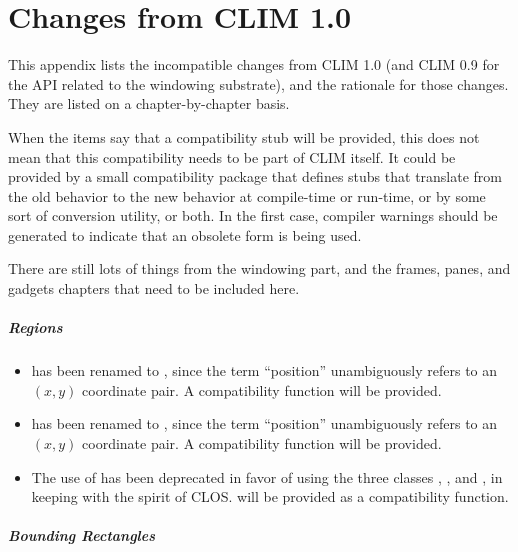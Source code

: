 
\chapter {Changes from CLIM 1.0}
\label {changes}

This appendix lists the incompatible changes from CLIM 1.0 (and CLIM 0.9 for the
API related to the windowing substrate), and the rationale for those changes.
They are listed on a chapter-by-chapter basis.

When the items say that a compatibility stub will be provided, this does not
mean that this compatibility needs to be part of CLIM itself.  It could be
provided by a small compatibility package that defines stubs that translate from
the old behavior to the new behavior at compile-time or run-time, or by some
sort of conversion utility, or both.  In the first case, compiler warnings
should be generated to indicate that an obsolete form is being used.

 {There are still lots of things from the windowing part, and the
frames, panes, and gadgets chapters that need to be included here.}

\paragraph {Regions}

\begin{itemize}
\item {} has been renamed to , since the
term ``position'' unambiguously refers to an $(x,y)$ coordinate pair.  A
compatibility function will be provided.

\item {} has been renamed to
, since the term ``position'' unambiguously
refers to an $(x,y)$ coordinate pair.  A compatibility function will be
provided.

\item The use of  has been deprecated in favor of using
the three classes , ,
and , in keeping with the spirit of CLOS.
 will be provided as a compatibility function.
\end{itemize}


\paragraph {Bounding Rectangles}

